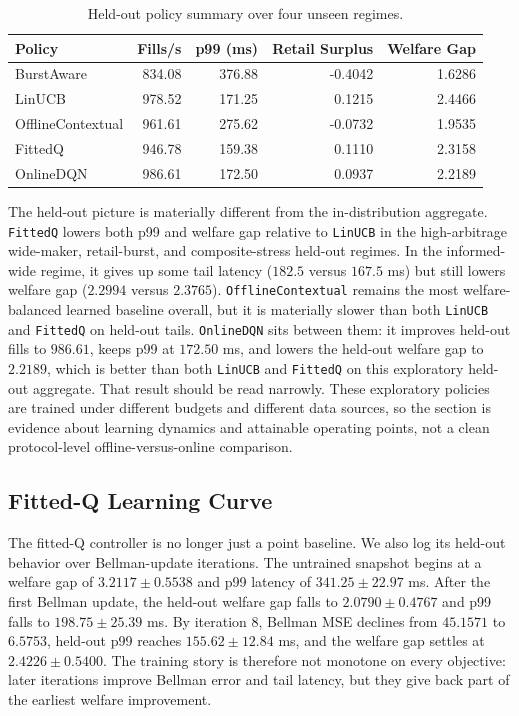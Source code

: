 \documentclass[11pt]{article}
\begin{document}
\begin{table}[t]
\centering
\begin{tabular}{lrrrr}
\toprule
Policy & Fills/s & p99 (ms) & Retail Surplus & Welfare Gap \\
\midrule
BurstAware & 834.08 & 376.88 & -0.4042 & 1.6286 \\
LinUCB & 978.52 & 171.25 & 0.1215 & 2.4466 \\
OfflineContextual & 961.61 & 275.62 & -0.0732 & 1.9535 \\
FittedQ & 946.78 & 159.38 & 0.1110 & 2.3158 \\
OnlineDQN & 986.61 & 172.50 & 0.0937 & 2.2189 \\
\bottomrule
\end{tabular}
\caption{Held-out policy summary over four unseen regimes.}
\label{tab:heldout}
\end{table}

The held-out picture is materially different from the in-distribution aggregate. \texttt{FittedQ} lowers both p99 and welfare gap relative to \texttt{LinUCB} in the high-arbitrage wide-maker, retail-burst, and composite-stress held-out regimes. In the informed-wide regime, it gives up some tail latency ($182.5$ versus $167.5$ ms) but still lowers welfare gap ($2.2994$ versus $2.3765$). \texttt{OfflineContextual} remains the most welfare-balanced learned baseline overall, but it is materially slower than both \texttt{LinUCB} and \texttt{FittedQ} on held-out tails. \texttt{OnlineDQN} sits between them: it improves held-out fills to $986.61$, keeps p99 at $172.50$ ms, and lowers the held-out welfare gap to $2.2189$, which is better than both \texttt{LinUCB} and \texttt{FittedQ} on this exploratory held-out aggregate. That result should be read narrowly. These exploratory policies are trained under different budgets and different data sources, so the section is evidence about learning dynamics and attainable operating points, not a clean protocol-level offline-versus-online comparison.

\subsection{Fitted-Q Learning Curve}
The fitted-Q controller is no longer just a point baseline. We also log its held-out behavior over Bellman-update iterations. The untrained snapshot begins at a welfare gap of $3.2117 \pm 0.5538$ and p99 latency of $341.25 \pm 22.97$ ms. After the first Bellman update, the held-out welfare gap falls to $2.0790 \pm 0.4767$ and p99 falls to $198.75 \pm 25.39$ ms. By iteration $8$, Bellman MSE declines from $45.1571$ to $6.5753$, held-out p99 reaches $155.62 \pm 12.84$ ms, and the welfare gap settles at $2.4226 \pm 0.5400$. The training story is therefore not monotone on every objective: later iterations improve Bellman error and tail latency, but they give back part of the earliest welfare improvement.
\end{document}
